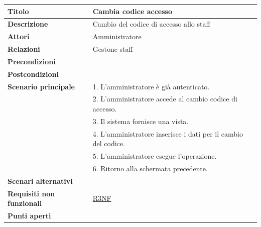 \documentclass[a4paper]{article}
\begin{document}
\begin{center}
\begin{tabularx}{1\textwidth}{|l|X|}
    \hline
	\textbf{Titolo} & Cambia codice accesso \\
	\hline
	\textbf{Descrizione} & Cambio del codice di accesso allo staff \\
	\hline
	\textbf{Attori} & Amministratore \\
	\hline
	\textbf{Relazioni} & Gestone staff \\
	\hline
	\textbf{Precondizioni} &  \\
	\hline
	\textbf{Postcondizioni} &  \\
	\hline
	\textbf{Scenario principale} & 1. L'amministratore è già autenticato.\\
	                             & 2. L'amministratore accede al cambio codice di accesso. \\
								 & 3. Il sistema fornisce una vista. \\
								 & 4. L'amministratore inserisce i dati per il cambio del codice. \\
								 & 5. L'amministratore esegue l'operazione.\\
								 & 6. Ritorno alla schermata precedente.\\
	\hline
	\textbf{Scenari alternativi} & \\
	\hline
	\textbf{Requisiti non funzionali} & \hyperlink{R3NF}{R3NF} \\
	\hline
	\textbf{Punti aperti} & \\
	\hline
\end{tabularx}
\end{center}

\end{document}
